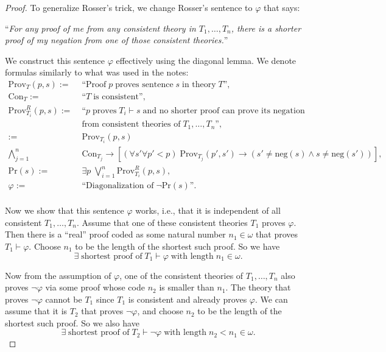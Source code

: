 \documentclass{article}
\begin{document}
\begin{enumerate}[label={\bf Q\arabic*:}]
\begin{proof}
      To generalize Rosser's trick, we change Rosser's sentence to
      $\varphi$ that says:
      \begin{center}
        ``\textit{For any proof of me from any consistent theory in
        $T_1,\ldots,T_n$, there is a shorter proof of my
        negation from one of those consistent theories.}''
      \end{center}

      We construct this sentence $\varphi$ effectively using the diagonal
      lemma. We denote formulas similarly to what was used in the notes:
      \begin{align*}
        \text{Prov}_T(p,s) :=&\;\text{``Proof}\; p\; \text{proves
          sentence}\; s\; \text{in theory}\; T\text{''},\\
        \text{Con}_T :=&\;\text{``}T\; \text{is consistent''},\\
        \text{Prov}_{T_i}^R(p,s) :=&\;\text{``}p\; \text{proves}\;
          T_i\vdash s\; \text{and no shorter proof can prove its
          negation}\\
          &\;\text{from consistent theories of}\; T_1,\ldots,T_n
          \text{''},\\ :=&\;\text{Prov}_{T_i}(p,s)\\
          \bigwedge_{j=1}^n&\; \text{Con}_{T_j} \rightarrow [(\forall
          s'\forall p'<p)\; \text{Prov}_{T_j}(p',s') \rightarrow
          (s'\neq\text{neg}(s) \wedge s\neq\text{neg}(s'))], \\
        \text{Pr}(s) :=&\;\exists p\; \bigvee_{i=1}^n
          \text{Prov}_{T_i}^R(p,s),\\
        \varphi :=&\;\text{``Diagonalization of}\; \neg\text{Pr}(s)
          \text{''}.\\
      \end{align*}

      Now we show that this sentence $\varphi$ works, i.e., that it is
      independent of all consistent $T_1,\ldots,T_n$. Assume that one of
      these consistent theories $T_1$ proves $\varphi$. Then there is a
      ``real'' proof coded as some natural number $n_1\in\omega$ that
      proves $T_1\vdash\varphi$. Choose $n_1$ to be the length of the
      shortest such proof. So we have
      \[\exists\; \text{shortest proof of}\; T_1\vdash\varphi\; \text{with
      length}\; n_1\in\omega.\]

      Now from the assumption of $\varphi$, one of the consistent theories
      of $T_1,\ldots,T_n$ also proves $\neg\varphi$ via some proof whose
      code $n_2$ is smaller than $n_1$. The theory that proves
      $\neg\varphi$ cannot be $T_1$ since $T_1$ is consistent and already
      proves $\varphi$. We can assume that it is $T_2$ that proves
      $\neg\varphi$, and choose $n_2$ to be the length of the shortest such
      proof. So we also have
      \[\exists\; \text{shortest proof of}\; T_2\vdash\neg\varphi\;
      \text{with length}\; n_2<n_1\in\omega.\]


\end{proof}
\end{enumerate}
\end{document}
